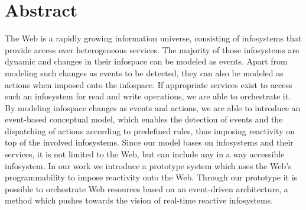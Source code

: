 \chapter*{Abstract}
The Web is a rapidly growing information universe, consisting of \textrm{\glspl{infosystem}} that provide access over heterogeneous services.
The majority of those \textrm{\glspl{infosystem}} are dynamic and changes in their \textrm{\gls{infospace}} can be modeled as events.
Apart from modeling such changes as events to be detected, they can also be modeled as actions when imposed onto the \textrm{\gls{infospace}}.
If appropriate services exist to access such an \textrm{\gls{infosystem}} for read and write operations, we are able to orchestrate it.
By modeling \textrm{\gls{infospace}} changes as events and actions, we are able to introduce an event-based conceptual model, which enables the detection of events and the dispatching of actions according to predefined rules, thus imposing reactivity on top of the involved \textrm{\glspl{infosystem}}.
Since our model bases on \textrm{\glspl{infosystem}} and their services, it is not limited to the Web, but can include any in a way accessible \textrm{\gls{infosystem}}.
In our work we introduce a prototype system which uses the Web's programmability to impose reactivity onto the Web.
Through our prototype it is possible to orchestrate Web resources based on an event-driven architecture, a method which pushes towards the vision of real-time reactive \textrm{\glspl{infosystem}}.


